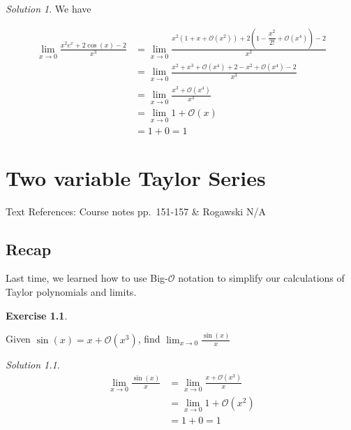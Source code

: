 \documentclass[
]{book}
\theoremstyle{definition}
\theoremstyle{definition}
\theoremstyle{definition}
\newtheorem{exercise}{Exercise}[chapter]
\theoremstyle{definition}
\theoremstyle{remark}
\newtheorem*{solution}{Solution}
\begin{document}
\begin{solution}

We have

\begin{align*}
\lim_{x\to 0}\frac{x^2e^x+2\cos(x)-2}{x^3} &= \lim_{x\to 0}\frac{x^2 (1+x+\mathcal{O}(x^2)) +2 (1-\dfrac{x^2}{2!}+\mathcal{O}(x^4))-2}{x^3}\\
&= \lim_{x\to 0} \frac{x^2+x^3+\mathcal{O}(x^4)+2-x^2+\mathcal{O}(x^4)-2}{x^3}\\
&= \lim_{x\to 0} \frac{x^3+\mathcal{O}(x^4)}{x^3}\\
&= \lim_{x\to 0} 1+\mathcal{O}(x) \\
&= 1+0 =1
\end{align*}

\end{solution}

\hypertarget{lec-34}{%
\chapter{Two variable Taylor Series}\label{lec-34}}

Text References: Course notes pp.~151-157 \& Rogawski N/A

\hypertarget{recap-32}{%
\section{Recap}\label{recap-32}}

Last time, we learned how to use Big-\(\mathcal{O}\) notation to simplify our calculations of Taylor polynomials and limits.

\begin{exercise}
\protect\hypertarget{exr:unlabeled-div-263}{}\label{exr:unlabeled-div-263}

Given \(\sin(x)=x+\mathcal{O}(x^3)\), find \(\displaystyle \lim_{x\to 0}\frac{\sin(x)}{x}\)

\end{exercise}

\begin{solution}

\begin{align*}
\lim_{x\to 0}\frac{\sin(x)}{x} &= \lim_{x\to 0}\frac{x+\mathcal{O}(x^3)}{x}\\
&= \lim_{x\to 0} 1+\mathcal{O}(x^2)\\
&= 1+0 =1
\end{align*}

\end{solution}
\end{document}
